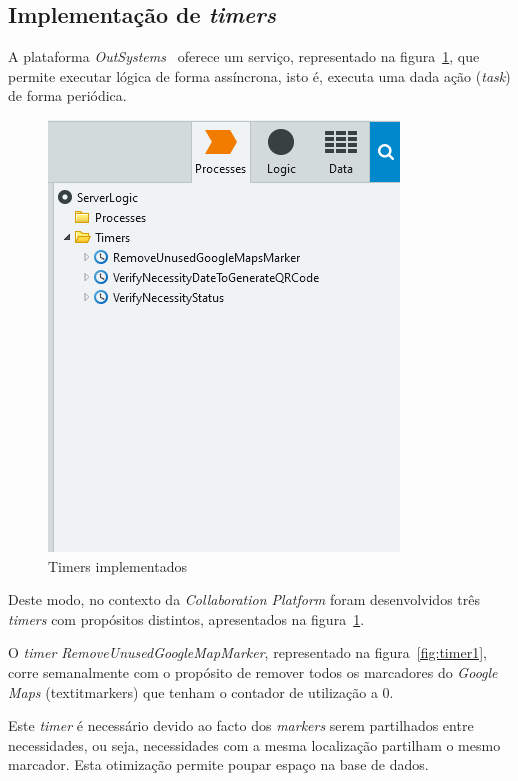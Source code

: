 \newpage

\subsection{Implementação de \textit{timers}}\label{subsec:implementacao:timers}

A plataforma \textit{OutSystems~\cite{outsystems}} oferece um serviço, representado na figura~\ref{fig:timers}, que permite executar lógica de forma assíncrona, isto é, executa uma dada ação (\textit{task}) de forma periódica. 

\begin{figure}[H]
  \centering 
  \includegraphics[scale=0.4]{figures/timers.png}
  \caption{Timers implementados}\label{fig:timers}
\end{figure}

Deste modo, no contexto da \textit{Collaboration Platform} foram desenvolvidos três \textit{timers} com propósitos distintos, apresentados na figura~\ref{fig:timers}.

\par
O \textit{timer RemoveUnusedGoogleMapMarker}, representado na figura~\ref{fig:timer1}, corre semanalmente com o propósito de remover todos os marcadores do \textit{Google Maps} (textit{markers}) que tenham o contador de utilização a 0. 
\par 
Este \textit{timer} é necessário devido ao facto dos \textit{markers} serem partilhados entre necessidades, ou seja, necessidades com 
 a mesma localização partilham o mesmo marcador. Esta otimização permite poupar espaço na base de dados.

